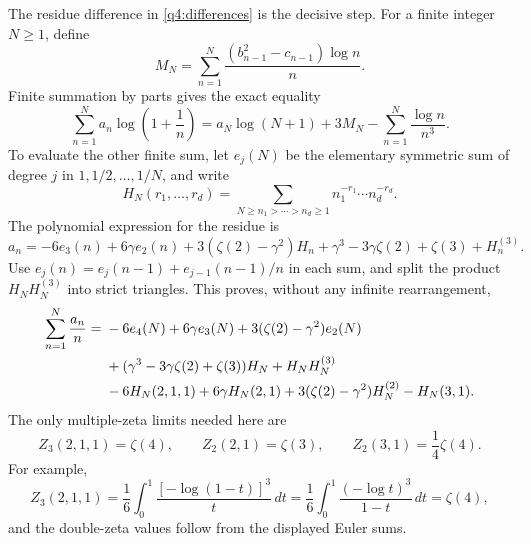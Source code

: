The residue difference in \eqref{q4:differences} is the decisive step.
For a finite integer $N\geq1$, define
\[
 M_N=\sum_{n=1}^N
             \frac{(b_{n-1}^2-c_{n-1})\log n}{n}.
\]
Finite summation by parts gives the exact equality
\begin{equation}\label{q4:logsum}
 \sum_{n=1}^N a_n\log\left(1+\frac1n\right)
       =a_N\log(N+1)+3M_N-\sum_{n=1}^N\frac{\log n}{n^3}.
\end{equation}
To evaluate the other finite sum, let $e_j(N)$ be the elementary symmetric
sum of degree $j$ in $1,1/2,\ldots,1/N$, and write
\[
 H_N(r_1,\ldots,r_d)
  =\sum_{N\geq n_1>\cdots>n_d\geq1}
         n_1^{-r_1}\cdots n_d^{-r_d}.
\]
The polynomial expression for the residue is
\begin{equation}\label{q4:elementary}
 a_n=-6e_3(n)+6\gamma e_2(n)+3(\zeta(2)-\gamma^2)H_n
           +\gamma^3-3\gamma\zeta(2)+\zeta(3)+H_n^{(3)}.
\end{equation}
Use $e_j(n)=e_j(n-1)+e_{j-1}(n-1)/n$ in each sum, and split the
product $H_NH_N^{(3)}$ into strict triangles.  This proves, without
any infinite rearrangement,
\begin{align}\label{q4:finitesum}
 \sum_{n=1}^N\frac{a_n}{n}
 ={}&-6e_4(N)+6\gamma e_3(N)+3(\zeta(2)-\gamma^2)e_2(N)\notag\\
 &+(\gamma^3-3\gamma\zeta(2)+\zeta(3))H_N+H_NH_N^{(3)}\notag\\
 &-6H_N(2,1,1)+6\gamma H_N(2,1)
       +3(\zeta(2)-\gamma^2)H_N^{(2)}-H_N(3,1).
\end{align}
The only multiple-zeta limits needed here are
\[
 Z_3(2,1,1)=\zeta(4),\qquad
 Z_2(2,1)=\zeta(3),\qquad
 Z_2(3,1)=\frac14\zeta(4).
\]
For example,
\[
 Z_3(2,1,1)=\frac16\int_0^1\frac{[-\log(1-t)]^3}{t}\,dt
           =\frac16\int_0^1\frac{(-\log t)^3}{1-t}\,dt
           =\zeta(4),
\]
and the double-zeta values follow from the displayed Euler sums.

